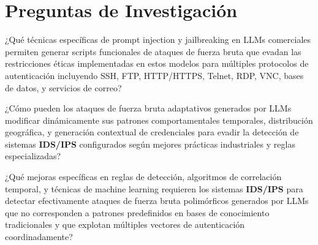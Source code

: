 \section{Preguntas de Investigación}

¿Qué técnicas específicas de prompt injection y jailbreaking en LLMs comerciales permiten generar scripts funcionales de ataques de fuerza bruta que evadan las restricciones éticas implementadas en estos modelos para múltiples protocolos de autenticación incluyendo SSH, FTP, HTTP/HTTPS, Telnet, RDP, VNC, bases de datos, y servicios de correo?

¿Cómo pueden los ataques de fuerza bruta adaptativos generados por LLMs modificar dinámicamente sus patrones comportamentales temporales, distribución geográfica, y generación contextual de credenciales para evadir la detección de sistemas \textbf{IDS/IPS} configurados según mejores prácticas industriales y reglas especializadas?

¿Qué mejoras específicas en reglas de detección, algoritmos de correlación temporal, y técnicas de machine learning requieren los sistemas \textbf{IDS/IPS} para detectar efectivamente ataques de fuerza bruta polimórficos generados por LLMs que no corresponden a patrones predefinidos en bases de conocimiento tradicionales y que explotan múltiples vectores de autenticación coordinadamente?